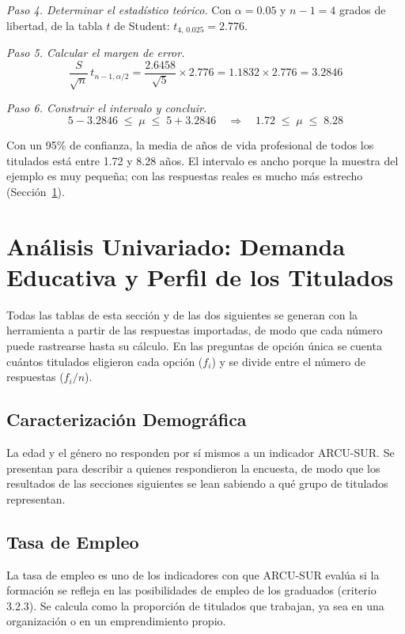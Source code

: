 \documentclass[12pt, a4paper]{article}
\begin{document}
\textit{Paso 4. Determinar el estadístico teórico.} Con $\alpha = 0.05$ y
$n - 1 = 4$ grados de libertad, de la tabla $t$ de Student:
$t_{4,\,0.025} = 2.776$.

\textit{Paso 5. Calcular el margen de error.}
\[
\frac{S}{\sqrt{n}}\,t_{n-1,\alpha/2} = \frac{2.6458}{\sqrt{5}} \times 2.776 = 1.1832 \times 2.776 = 3.2846
\]

\textit{Paso 6. Construir el intervalo y concluir.}
\[
5 - 3.2846 \;\le\; \mu \;\le\; 5 + 3.2846 \quad\Longrightarrow\quad 1.72 \;\le\; \mu \;\le\; 8.28
\]

Con un 95\% de confianza, la media de años de vida profesional de todos
los titulados está entre 1.72 y 8.28 años. El intervalo es ancho porque
la muestra del ejemplo es muy pequeña; con las respuestas reales es
mucho más estrecho (Sección~\ref{sec:titulados}).

\section{Análisis Univariado: Demanda Educativa y Perfil de los Titulados}\label{sec:titulados}

Todas las tablas de esta sección y de las dos siguientes se generan con
la herramienta a partir de las respuestas importadas, de modo que cada
número puede rastrearse hasta su cálculo. En las preguntas de opción
única se cuenta cuántos titulados eligieron cada opción ($f_i$) y se
divide entre el número de respuestas ($f_i/n$).

\subsection{Caracterización Demográfica}

La edad y el género no responden por sí mismos a un indicador ARCU-SUR.
Se presentan para describir a quienes respondieron la encuesta, de modo
que los resultados de las secciones siguientes se lean sabiendo a qué
grupo de titulados representan.



\subsection{Tasa de Empleo}

La tasa de empleo es uno de los indicadores con que ARCU-SUR evalúa si
la formación se refleja en las posibilidades de empleo de los graduados
(criterio 3.2.3). Se calcula como la proporción de titulados que
trabajan, ya sea en una organización o en un emprendimiento propio.
\end{document}

